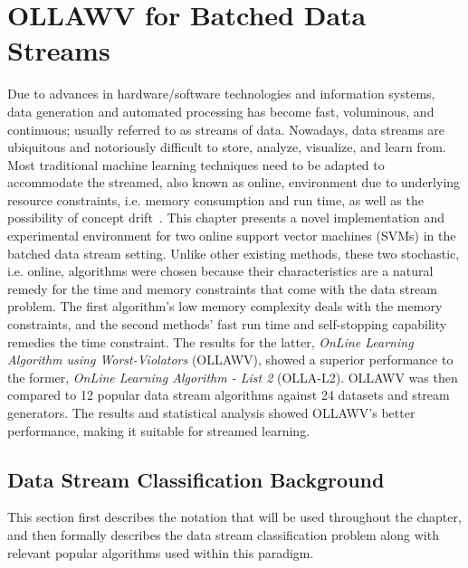 \documentclass[reqno]{vcuthesis}
\numberwithin{equation}{chapter}
\begin{document}
\chapter{OLLAWV for Batched Data Streams}\label{chap:streams}
Due to advances in hardware/software technologies and information systems, data generation and automated processing has become fast, voluminous, and continuous; usually referred to as streams of data. Nowadays, data streams are ubiquitous and notoriously difficult to store, analyze, visualize, and learn from. Most traditional machine learning techniques need to be adapted to accommodate the streamed, also known as online, environment due to underlying resource constraints, i.e. memory consumption and run time, as well as the possibility of concept drift~\cite{gama2014survey}. This chapter presents a novel implementation and experimental environment for two online support vector machines (SVMs) in the batched data stream setting. Unlike other existing methods, these two stochastic, i.e. online, algorithms were chosen because their characteristics are a natural remedy for the time and memory constraints that come with the data stream problem. The first algorithm's low memory complexity deals with the memory constraints, and the second methods' fast run time and self-stopping capability remedies the time constraint. The results for the latter, \textit{OnLine Learning Algorithm using Worst-Violators} (OLLAWV), showed a superior performance to the former, \textit{OnLine Learning Algorithm - List 2} (OLLA-L2). OLLAWV was then compared to 12 popular data stream algorithms against 24 datasets and stream generators. The results and statistical analysis showed OLLAWV's better performance, making it suitable for streamed learning. 

\section{Data Stream Classification Background}
This section first describes the notation that will be used throughout the chapter, and then formally describes the data stream classification problem along with relevant popular algorithms used within this paradigm.
\end{document}
